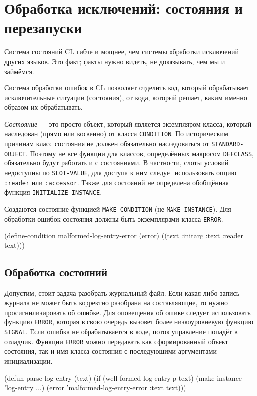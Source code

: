 \section{Обработка исключений: состояния и перезапуски}
Система состояний CL гибче и мощнее, чем системы обработки исключений других языков. Это факт; факты нужно видеть, не доказывать, чем мы и займёмся.

Система обработки ошибок в CL позволяет отделить код, который обрабатывает исключительные ситуации (состояния), от кода, который решает, каким именно образом их обрабатывать.

\emph{Состояние} — это просто объект, который является экземпляром класса, который наследован (прямо или косвенно) от класса \lstinline{CONDITION}. По историческим причинам класс состояния не должен обязательно наследоваться от \lstinline{STANDARD-OBJECT}. Поэтому не все функции для классов, определённых макросом \lstinline{DEFCLASS}, обязательно будут работать и с состояниями. В частности, слоты условий недоступны по \lstinline{SLOT-VALUE}, для доступа к ним следует использовать опцию \lstinline{:reader} или \lstinline{:accessor}. Также для состояний не определена обобщённая функция \lstinline{INITIALIZE-INSTANCE}.

Создаются состояние функцией \lstinline{MAKE-CONDITION} (не \lstinline{MAKE-INSTANCE}). Для обработки ошибок состояния должны быть экземплярами класса \lstinline{ERROR}.
\begin{cllst}{}{}
(define-condition malformed-log-entry-error (error)
  ((text :initarg :text :reader text)))
\end{cllst}

\subsection{Обработка состояний}
Допустим, стоит задача разобрать журнальный файл. Если какая-либо запись журнала не может быть корректно разобрана на составляющие, то нужно просигнилизировать об ошибке. Для оповещения об ошике следует использовать функцию \lstinline{ERROR}, которая в свою очередь вызовет более низкоуровневую функцию \lstinline{SIGNAL}. Если ошибка не обрабатывается в коде, поток управление попадёт в отладчик. Функции \lstinline{ERROR} можно передавать как сформированный объект состояния, так и имя класса состояния с последующими аргументами инициализации.
\begin{cllst}{}{}
(defun parse-log-entry (text)
  (if (well-formed-log-entry-p text)
    (make-instance 'log-entry ...)
    (error 'malformed-log-entry-error :text text)))
\end{cllst}

